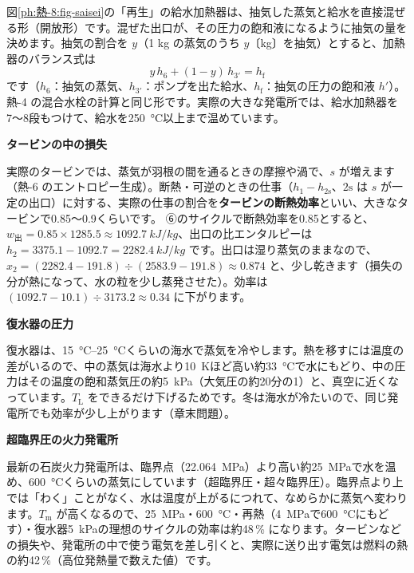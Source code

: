 \noindent 図\ref{ph:熱-8:fig-saisei}の「再生」の給水加熱器は、抽気した蒸気と給水を直接混ぜる形（開放形）です。混ぜた出口が、その圧力の飽和液になるように抽気の量を決めます。抽気の割合を $y$（1 kg の蒸気のうち $y$〔kg〕を抽気）とすると、加熱器のバランス式は
\[ y\,h_6+(1-y)\,h_{3'}=h_{\mathrm f} \]
です（$h_6$：抽気の蒸気、$h_{3'}$：ポンプを出た給水、$h_{\mathrm f}$：抽気の圧力の飽和液 $h'$）。熱-4 の混合水栓の計算と同じ形です。実際の大きな発電所では、給水加熱器を7〜8段もつけて、給水を\qty{250}{\celsius}以上まで温めています。


\noindent\label{ph:熱-8:sec8}\textbf{タービンの中の損失}\par\nobreak
実際のタービンでは、蒸気が羽根の間を通るときの摩擦や渦で、$s$ が増えます（熱-6 のエントロピー生成）。断熱・可逆のときの仕事（$h_1-h_{2\mathrm s}$、$2\mathrm s$ は $s$ が一定の出口）に対する、実際の仕事の割合を\textbf{タービンの断熱効率}といい、大きなタービンで0.85〜0.9くらいです。
⑥のサイクルで断熱効率を0.85とすると、$w_{\text{出}}=0.85\times1285.5\approx\qty{1092.7}{kJ/kg}$、出口の比エンタルピーは $h_2=3375.1-1092.7=\qty{2282.4}{kJ/kg}$ です。出口は湿り蒸気のままなので、$x_2=(2282.4-191.8)\div(2583.9-191.8)\approx0.874$ と、少し乾きます（損失の分が熱になって、水の粒を少し蒸発させた）。効率は $(1092.7-10.1)\div3173.2\approx0.34$ に下がります。

\noindent\textbf{復水器の圧力}\par\nobreak
復水器は、\qtyrange{15}{25}{\celsius}くらいの海水で蒸気を冷やします。熱を移すには温度の差がいるので、中の蒸気は海水より\qty{10}{K}ほど高い約\qty{33}{\celsius}で水にもどり、中の圧力はその温度の飽和蒸気圧の約\qty{5}{kPa}（大気圧の約20分の1）と、真空に近くなっています。$T_{\mathrm L}$ をできるだけ下げるためです。冬は海水が冷たいので、同じ発電所でも効率が少し上がります（章末問題）。

\noindent\textbf{超臨界圧の火力発電所}\par\nobreak
最新の石炭火力発電所は、臨界点（\qty{22.064}{MPa}）より高い約\qty{25}{MPa}で水を温め、\qty{600}{\celsius}くらいの蒸気にしています（超臨界圧・超々臨界圧）。臨界点より上では「わく」ことがなく、水は温度が上がるにつれて、なめらかに蒸気へ変わります。$T_{\mathrm m}$ が高くなるので、\qty{25}{MPa}・\qty{600}{\celsius}・再熱（\qty{4}{MPa}で\qty{600}{\celsius}にもどす）・復水器\qty{5}{kPa}の理想のサイクルの効率は約48\,\% になります。タービンなどの損失や、発電所の中で使う電気を差し引くと、実際に送り出す電気は燃料の熱の約42\,\%（高位発熱量で数えた値）です。

